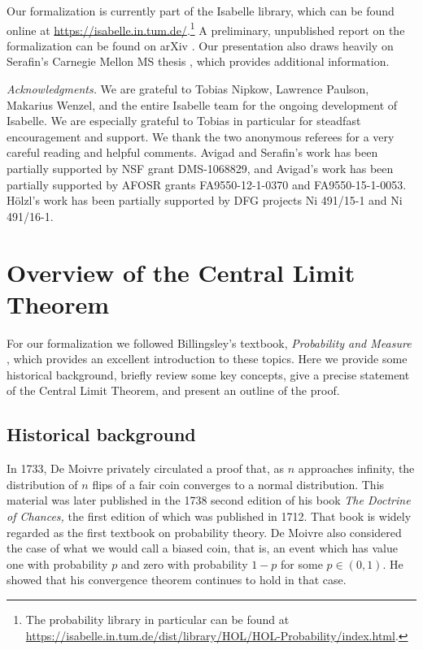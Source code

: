 \documentclass{svjour3}
\begin{document}
Our formalization is currently part of the Isabelle library, which can be found online at \url{https://isabelle.in.tum.de/}.\footnote{The probability library in particular can be found at \url{https://isabelle.in.tum.de/dist/library/HOL/HOL-Probability/index.html}.} A preliminary, unpublished report on the formalization can be found on arXiv \cite{avigad:hoelzl:serafin:14}. Our presentation also draws heavily on Serafin's Carnegie Mellon MS thesis \cite{serafin:15}, which provides additional information.

\emph{Acknowledgments.} We are grateful to Tobias Nipkow, Lawrence Paulson, Makarius Wenzel, and the entire Isabelle team for the ongoing development of Isabelle. We are especially grateful to Tobias in particular for steadfast encouragement and support. We thank the two anonymous referees for a very careful reading and helpful comments. Avigad and Serafin's work has been partially supported by NSF grant DMS-1068829, and Avigad's work has been partially supported by AFOSR grants FA9550-12-1-0370 and FA9550-15-1-0053. H\"olzl's work has been partially supported by DFG projects Ni 491/15-1 and Ni 491/16-1.

\section{Overview of the Central Limit Theorem}
\label{section:overview}

For our formalization we followed Billingsley's textbook, \emph{Probability and Measure} \cite{billingsley:95}, which provides an excellent introduction to these topics. Here we provide some historical background, briefly review some key concepts, give a precise statement of the Central Limit Theorem, and present an outline of the proof.

\subsection{Historical background}
\label{subsection:historical}

In 1733, De Moivre privately circulated a proof that, as $n$ approaches infinity, the distribution of $n$ flips of a fair coin converges to a normal distribution. This material was later published in the 1738 second edition of his book {\em The Doctrine of Chances,} the first edition of which was published in 1712. That book is widely regarded as the first textbook on probability theory. De Moivre also considered the case of what we would call a biased coin, that is, an event which has value one with probability $p$ and zero with probability $1-p$ for some $p \in (0,1)$. He showed that his convergence theorem continues to hold in that case.
\end{document}

